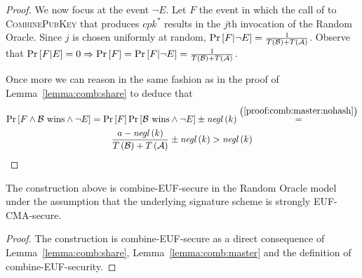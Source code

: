 \begin{proof}
      We now focus at the event $\neg E$. Let $F$ the event in which the call of
      to \textsc{CombinePubKey} that produces $cpk^*$ results in the $j$th
      invocation of the Random Oracle. Since $j$ is chosen uniformly at random,
      $\Pr\left[F | \neg E\right] = \frac{1}{T\left(\mathcal{B}\right) +
      T\left(\mathcal{A}\right)}$. Observe that $\Pr\left[F | E\right] = 0
      \Rightarrow \Pr\left[F\right] = \Pr\left[F | \neg E\right] =
      \frac{1}{T\left(\mathcal{B}\right) + T\left(\mathcal{A}\right)}$.

      Once more we can reason in the same fashion as in the proof of
      Lemma~\ref{lemma:comb:share} to deduce that
      \begin{gather*}
        \Pr\left[F \wedge \mathcal{B} \text{ wins} \wedge \neg E\right] =
        \Pr\left[F\right] \Pr\left[\mathcal{B} \text{ wins} \wedge \neg E\right]
        \pm \mathit{negl}\left(k\right)
        \overset{\left(\ref{proof:comb:master:nohash}\right)}{=} \\
        \frac{a - \mathit{negl}\left(k\right)}{T\left(\mathcal{B}\right) +
        T\left(\mathcal{A}\right)} \pm \mathit{negl}\left(k\right) >
        \mathit{negl}\left(k\right)
      \end{gather*}
    \end{proof}

    \begin{theorem}
      \label{thm:combsign}
      The construction above is \textsf{combine-EUF}-secure in the Random Oracle
      model under the assumption that the underlying signature scheme is
      strongly \textsf{EUF-CMA}-secure.
    \end{theorem}

    \begin{proof}
      The construction is \textsf{combine-EUF}-secure as a direct consequence of
      Lemma~\ref{lemma:comb:share}, Lemma~\ref{lemma:comb:master} and the
      definition of \textsf{combine-EUF}-security.
    \end{proof}
